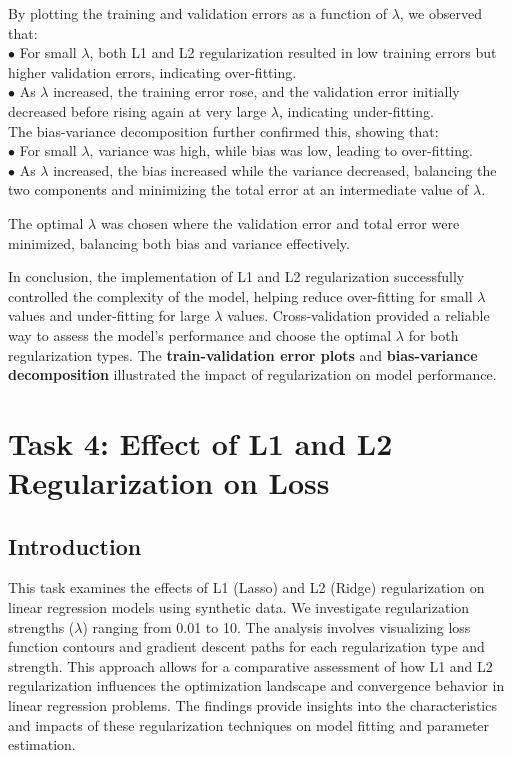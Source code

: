 \documentclass{article}
\begin{document}
By plotting the training and validation errors as a function of $\lambda$, we observed that:\\
$\bullet$ For small $\lambda$, both L1 and L2 regularization resulted in low training errors but higher validation errors, indicating over-fitting.\\
$\bullet$ As $\lambda$ increased, the training error rose, and the validation error initially decreased before rising again at very large $\lambda$, indicating under-fitting.
\\
The bias-variance decomposition further confirmed this, showing that:\\
$\bullet$ For small $\lambda$, variance was high, while bias was low, leading to over-fitting.\\
$\bullet$ As $\lambda$ increased, the bias increased while the variance decreased, balancing the two components and minimizing the total error at an intermediate value of $\lambda$.

The optimal $\lambda$ was chosen where the validation error and total error were minimized, balancing both bias and variance effectively.

In conclusion, the implementation of L1 and L2 regularization successfully controlled the complexity of the model, helping reduce over-fitting for small $\lambda$ values and under-fitting for large $\lambda$ values. Cross-validation provided a reliable way to assess the model's performance and choose the optimal $\lambda$ for both regularization types. The\textbf{ train-validation error plots} 
and \textbf{bias-variance decomposition} illustrated the impact of regularization on model performance.


\section{Task 4: Effect of L1 and L2 Regularization on Loss}

\subsection{Introduction}
\noindent This task examines the effects of L1 (Lasso) and L2 (Ridge) regularization on linear regression models using synthetic data. We investigate regularization strengths ($\lambda$) ranging from 0.01 to 10. The analysis involves visualizing loss function contours and gradient descent paths for each regularization type and strength. This approach allows for a comparative assessment of how L1 and L2 regularization influences the optimization landscape and convergence behavior in linear regression problems. The findings provide insights into the characteristics and impacts of these regularization techniques on model fitting and parameter estimation.
\end{document}
